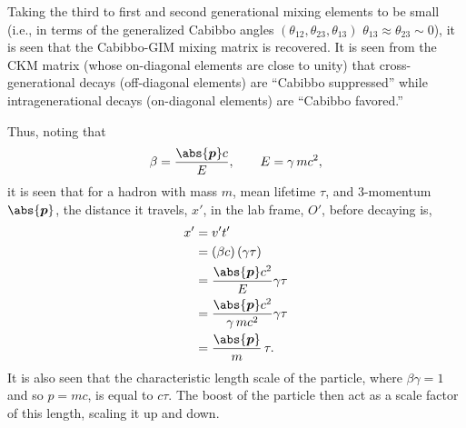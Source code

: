 Taking the third to first and second generational mixing elements to be small (i.e., in terms of the generalized Cabibbo angles $(\theta_{12},\theta_{23},\theta_{13})$ $\theta_{13} \approx \theta_{23} \sim 0$), it is seen that the Cabibbo-GIM mixing matrix is recovered.
It is seen from the CKM matrix (whose on-diagonal elements are close to unity) that cross-generational decays (off-diagonal elements) are ``Cabibbo suppressed'' while intragenerational decays (on-diagonal elements) are ``Cabibbo favored.''

Thus, noting that
\[
 \beta = \frac{\abs{\vec{p}}c}{E}, \qquad E = \gamma\, mc^2,
\]
it is seen that for a hadron with mass $m$, mean lifetime $\tau$, and 3-momentum $\abs{\vec{p}}$, the distance it travels, $x'$, in the lab frame, $O'$, before decaying is,
\[
 \begin{split}
  x'	&= v' t'	\\
  &= \left(\beta c\right) \left(\gamma \tau\right)	\\
  &= \frac{\abs{\vec{p}}c^2}{E} \gamma \tau	\\
  &= \frac{\abs{\vec{p}}c^2}{\gamma\, mc^2} \gamma \tau	\\
  &= \frac{\abs{\vec{p}}}{m}\, \tau.
 \end{split}
\]
It is also seen that the characteristic length scale of the particle, where $\beta\gamma=1$ and so $p=mc$, is equal to $c\tau$.
The boost of the particle then act as a scale factor of this length, scaling it up and down.
